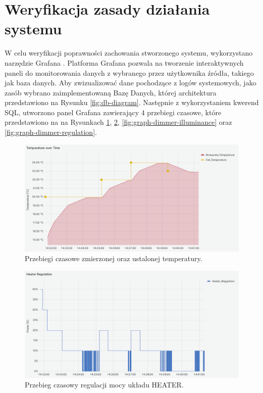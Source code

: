 \section{Weryfikacja zasady działania systemu}

W celu weryfikacji poprawności zachowania stworzonego systemu, wykorzystano narzędzie Grafana \cite{grafana}. Platforma Grafana pozwala na tworzenie interaktywnych paneli do monitorowania danych z wybranego przez użytkownika źródła, takiego jak baza danych. Aby zwizualizować dane pochodzące z logów systemowych, jako zasób wybrano zaimplementowaną Bazę Danych, której architektura przedstawiono na Rysunku \ref{fig:db-diagram}. Następnie z wykorzystaniem kwerend SQL, utworzono panel Grafana zawierający 4 przebiegi czasowe, które przedstawiono na  na Rysunkach \ref{fig:graph-heater-temperature}, \ref{fig:graph-heater-regulation}, \ref{fig:graph-dimmer-illuminance} oraz \ref{fig:graph-dimmer-regulation}.
    
\begin{figure}[H]
    \centering
    \includegraphics[width=0.8\linewidth]{graphics/grafana/temperature-lm.png}
    \caption{Przebiegi czasowe zmierzonej oraz ustalonej temperatury.}
    \label{fig:graph-heater-temperature}
\end{figure}

\begin{figure}[H]
    \centering
    \includegraphics[width=0.8\linewidth]{graphics/grafana/heater-regulation-lm.png}
    \caption{Przebieg czasowy regulacji mocy układu HEATER.}
    \label{fig:graph-heater-regulation}
\end{figure}


